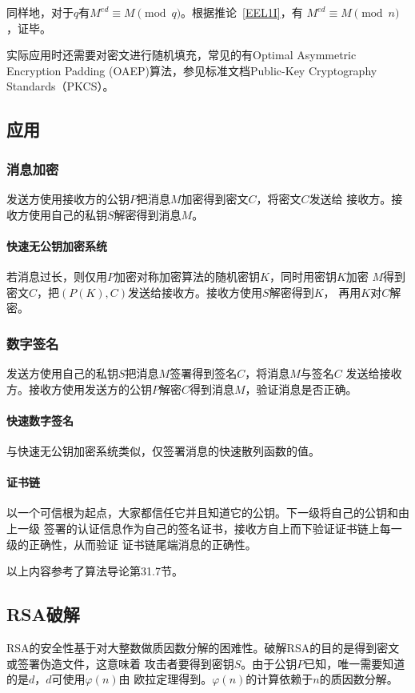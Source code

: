 同样地，对于$q$有$M^{ed}\equiv M \pmod{q}$。根据推论~\ref{EEL1I}，有
$M^{ed}\equiv M \pmod{n}$，证毕。

实际应用时还需要对密文进行随机填充，常见的有Optimal Asymmetric Encryption Padding
(OAEP)算法，参见标准文档Public-Key Cryptography Standards（PKCS）。
\subsection{应用}
\subsubsection{消息加密}
发送方使用接收方的公钥$P$把消息$M$加密得到密文$C$，将密文$C$发送给
接收方。接收方使用自己的私钥$S$解密得到消息$M$。
\paragraph{快速无公钥加密系统}
若消息过长，则仅用$P$加密对称加密算法的随机密钥$K$，同时用密钥$K$加密
$M$得到密文$C$，把$(P(K),C)$发送给接收方。接收方使用$S$解密得到$K$，
再用$K$对$C$解密。
\subsubsection{数字签名}
发送方使用自己的私钥$S$把消息$M$签署得到签名$C$，将消息$M$与签名$C$
发送给接收方。接收方使用发送方的公钥$P$解密$C$得到消息$M$，验证消息是否正确。
\paragraph{快速数字签名}
与快速无公钥加密系统类似，仅签署消息的快速散列函数的值。
\paragraph{证书链}
以一个可信根为起点，大家都信任它并且知道它的公钥。下一级将自己的公钥和由上一级
签署的认证信息作为自己的签名证书，接收方自上而下验证证书链上每一级的正确性，从而验证
证书链尾端消息的正确性。

以上内容参考了算法导论\cite{ITA3}第31.7节。
\subsection{RSA破解}
RSA的安全性基于对大整数做质因数分解的困难性。破解RSA的目的是得到密文或签署伪造文件，这意味着
攻击者要得到密钥$S$。由于公钥$P$已知，唯一需要知道的是$d$，$d$可使用$\varphi(n)$由
欧拉定理得到。$\varphi(n)$的计算依赖于$n$的质因数分解。
